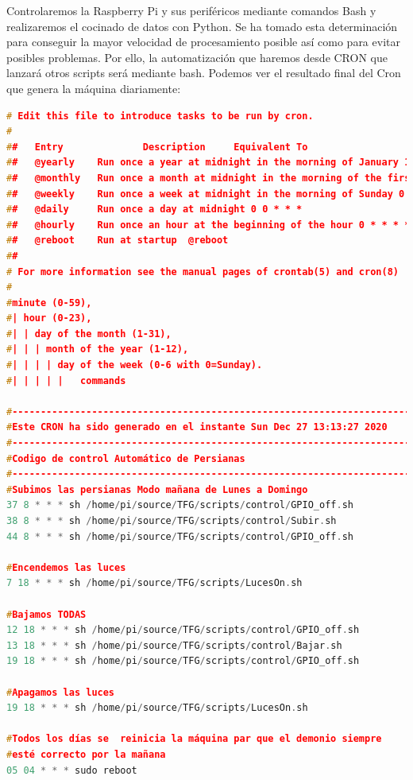 Controlaremos la Raspberry Pi y sus periféricos mediante comandos Bash y realizaremos el cocinado de datos con Python. Se ha tomado esta determinación para conseguir la mayor velocidad de procesamiento posible así como para evitar posibles problemas. Por ello, la automatización que haremos desde CRON que lanzará otros scripts será mediante bash. Podemos ver el resultado final del Cron que genera la máquina diariamente:

\begin{lstlisting}[language=cpp, basicstyle=\tiny, caption={Crontab funcionando correctamente.}]
# Edit this file to introduce tasks to be run by cron.
# 
##   Entry              Description     Equivalent To
##   @yearly    Run once a year at midnight in the morning of January 1 0 0 1 1 *
##   @monthly   Run once a month at midnight in the morning of the first of the month 0 0 1 * *
##   @weekly    Run once a week at midnight in the morning of Sunday 0 0 * * 0
##   @daily     Run once a day at midnight 0 0 * * *
##   @hourly    Run once an hour at the beginning of the hour 0 * * * *
##   @reboot    Run at startup  @reboot
##   
# For more information see the manual pages of crontab(5) and cron(8)
# 
#minute (0-59),
#| hour (0-23),
#| | day of the month (1-31),
#| | | month of the year (1-12),
#| | | | day of the week (0-6 with 0=Sunday).
#| | | | |   commands

#--------------------------------------------------------------------------
#Este CRON ha sido generado en el instante Sun Dec 27 13:13:27 2020
#--------------------------------------------------------------------------
#Codigo de control Automático de Persianas 
#--------------------------------------------------------------------------
#Subimos las persianas Modo mañana de Lunes a Domingo
37 8 * * * sh /home/pi/source/TFG/scripts/control/GPIO_off.sh
38 8 * * * sh /home/pi/source/TFG/scripts/control/Subir.sh
44 8 * * * sh /home/pi/source/TFG/scripts/control/GPIO_off.sh

#Encendemos las luces
7 18 * * * sh /home/pi/source/TFG/scripts/LucesOn.sh

#Bajamos TODAS
12 18 * * * sh /home/pi/source/TFG/scripts/control/GPIO_off.sh
13 18 * * * sh /home/pi/source/TFG/scripts/control/Bajar.sh
19 18 * * * sh /home/pi/source/TFG/scripts/control/GPIO_off.sh

#Apagamos las luces
19 18 * * * sh /home/pi/source/TFG/scripts/LucesOn.sh

#Todos los días se  reinicia la máquina par que el demonio siempre 
#esté correcto por la mañana
05 04 * * * sudo reboot


\end{lstlisting}
